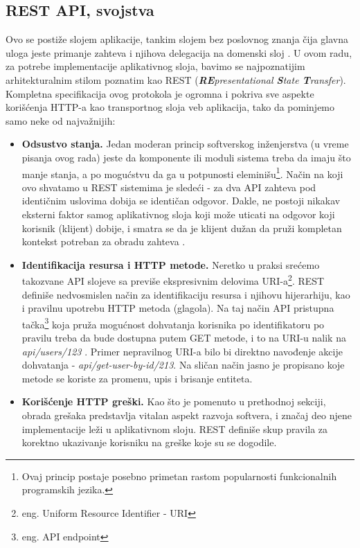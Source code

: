 \documentclass[12pt,oneside]{memoir}
\begin{document}
\subsection{REST API, svojstva}
\label{sec:restapi}

Ovo se postiže slojem aplikacije, tankim slojem bez poslovnog znanja čija glavna uloga jeste primanje zahteva i njihova delegacija na domenski sloj \cite{dddfull}. U ovom radu, za potrebe implementacije aplikativnog sloja, bavimo se najpoznatijim arhitekturalnim stilom poznatim kao REST (\textit{\textbf{RE}presentational \textbf{S}tate \textbf{T}ransfer}). Kompletna specifikacija ovog protokola je ogromna i pokriva sve aspekte korišćenja HTTP-a kao transportnog sloja veb aplikacija, tako da pominjemo samo neke od najvažnijih:

\begin{itemize}
    \item \textbf{Odsustvo stanja.} Jedan moderan princip softverskog inženjerstva (u vreme pisanja ovog rada) jeste da komponente ili moduli sistema treba da imaju što manje stanja, a po mogućstvu da ga u potpunosti eleminišu\footnote{Ovaj princip postaje posebno primetan rastom popularnosti funkcionalnih programskih jezika.}. Način na koji ovo shvatamo u REST sistemima je sledeći - za dva API zahteva pod identičnim uslovima dobija se identičan odgovor. Dakle, ne postoji nikakav eksterni faktor samog aplikativnog sloja koji može uticati na odgovor koji korisnik (klijent) dobije, i smatra se da je klijent dužan da pruži kompletan kontekst potreban za obradu zahteva \cite{restapi}.

    \item \textbf{Identifikacija resursa i HTTP metode.} Neretko u praksi srećemo takozvane API slojeve sa previše ekspresivnim delovima URI-a\footnote{eng. Uniform Resource Identifier - URI}. REST definiše nedvosmislen način za identifikaciju resursa i njihovu hijerarhiju, kao i pravilnu upotrebu HTTP metoda (glagola). Na taj način API pristupna tačka\footnote{eng. API endpoint} koja pruža mogućnost dohvatanja korisnika po identifikatoru po pravilu treba da bude dostupna putem GET metode, i to na URI-u nalik na \textit{api/users/123} \cite{restapi}. Primer nepravilnog URI-a bilo bi direktno navođenje akcije dohvatanja - \textit{api/get-user-by-id/213}. Na sličan način jasno je propisano koje metode se koriste za promenu, upis i brisanje entiteta.

    \item \textbf{Korišćenje HTTP greški.} Kao što je pomenuto u prethodnoj sekciji, obrada grešaka predstavlja vitalan aspekt razvoja softvera, i značaj deo njene implementacije leži u aplikativnom sloju. REST definiše skup pravila za korektno ukazivanje korisniku na greške koje su se dogodile.  
\end{itemize}
\end{document}
